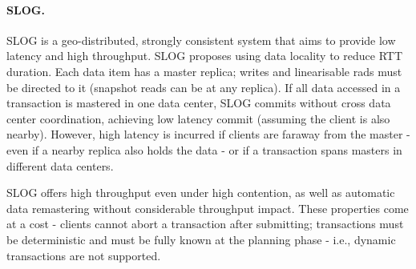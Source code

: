 
\paragraph{SLOG.} SLOG \cite{slog} is a geo-distributed, strongly consistent system that aims to provide low latency and high throughput.
SLOG proposes using data locality to reduce RTT duration.
Each data item has a master replica;
writes and linearisable rads must be directed to it (snapshot reads can be at any replica).
If all data accessed in a transaction is mastered in one data center, 
SLOG commits without cross data center coordination, achieving low latency commit (assuming the client is also nearby).
However, high latency is incurred if clients are faraway from the master - even if a nearby replica also holds the data -  or if a transaction spans masters in different data centers.

SLOG offers high throughput even under high contention,
as well as automatic data remastering without considerable throughput impact.
These properties come at a cost - clients cannot abort a transaction after submitting; transactions must be deterministic and must be fully known at the planning phase - i.e., dynamic transactions are not supported.


